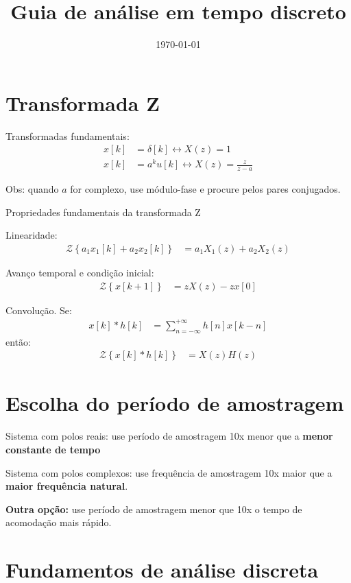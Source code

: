 \documentclass[12pt, a4paper]{article}
\title{Guia de análise em tempo discreto}
\date{\today}
\begin{document}
\maketitle

\section{Transformada Z}

Transformadas fundamentais:
\begin{align}
	x[k] &=\delta[k] \leftrightarrow X(z) = 1\\
	x[k] &= a^ku[k] \leftrightarrow X(z) = \frac{z}{z-a}
\end{align}

Obs: quando $a$ for complexo, use módulo-fase e procure pelos pares conjugados.

Propriedades fundamentais da transformada Z

\newcommand{\Z}[1]{\mathcal{Z}\left\{#1\right\}}
Linearidade:
\begin{align}
	\Z{a_1x_1[k]+a_2x_2[k]} &= a_1X_1(z) + a_2X_2(z)
\end{align}

Avanço temporal e condição inicial:
\begin{align}
	\Z{x[k+1]} &= zX(z)-zx[0] 
\end{align}

Convolução. Se:
\begin{align}
 	x[k]*h[k] &= \sum_{n=-\infty}^{+\infty} h[n]x[k-n]
\end{align}
então:
\begin{align}
	\Z{x[k]*h[k]} &= X(z)H(z)
\end{align}

\section{Escolha do período de amostragem}

Sistema com polos reais: use período de amostragem 10x menor que a \textbf{menor constante de tempo}

Sistema com polos complexos: use frequência de amostragem 10x maior que a \textbf{maior frequência natural}.

\textbf{Outra opção: } use período de amostragem menor que 10x o tempo de acomodação mais rápido.

\section{Fundamentos de análise discreta}
\end{document}
